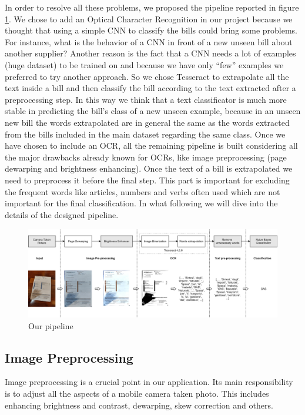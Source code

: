 \documentclass[10pt,twocolumn,letterpaper]{article}
\begin{document}
In order to resolve all these problems, we proposed the pipeline
reported in figure \ref{fig:pipeline}. We chose to add an Optical
Character Recognition in our project because we thought that using a
simple CNN to classify the bills could bring some problems. For
instance, what is the behavior of a CNN in front of a new unseen bill
about another supplier? Another reason is the fact that a CNN needs a
lot of examples (huge dataset) to be trained on and because we have
only ``few'' examples we preferred to try another approach. So we
chose Tesseract to extrapolate all the text inside a bill and then
classify the bill according to the text extracted after a
preprocessing step. In this way we think that a text classificator is
much more stable in predicting the bill's class of a new unseen
example, because in an unseen new bill the words extrapolated are in
general the same as the words extracted from the bills included in the
main dataset regarding the same class. Once we have chosen to include
an OCR, all the remaining pipeline is built considering all the major
drawbacks already known for OCRs, like image preprocessing (page
dewarping and brightness enhancing). Once the text of a bill is
extrapolated we need to preprocess it before the final step. This part
is important for excluding the frequent words like articles, numbers
and verbs often used which are not important for the final
classification. In what following we will dive into the details of the
designed pipeline.

\begin{figure}[!ht]
  \centering
  \includegraphics[width=1.0\textwidth]{images/pipeline.png}
  \caption{Our pipeline}
  \label{fig:pipeline}
\end{figure}

\subsection{Image Preprocessing}

Image preprocessing is a crucial point in our application. Its main
responsibility is to adjust all the aspects of a mobile camera taken
photo. This includes enhancing brightness and contrast, dewarping,
skew correction and others.
\end{document}
